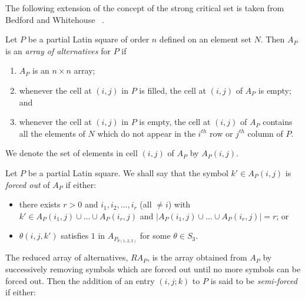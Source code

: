 The following extension of the concept of the strong critical set is
taken from Bedford and Whitehouse ~\cite{bandw}.

Let $P$ be a partial Latin square of order $n$ defined on an element set $N$.  
Then $A_P$ is an {\it array of alternatives} for $P$ if

\begin{enumerate}
\item $A_P$ is an $n \times n$ array;
\item whenever the cell at $(i,j)$ in $P$ is filled, the cell at $(i,j)$ of $A_P$ is empty; and
\item whenever the cell at $(i,j)$ in $P$ is empty, the cell at $(i,j)$ of $A_P$ contains all the elements of $N$ which do not appear in the $i^{th}$ row or $j^{th}$ column of $P$.
\end{enumerate}
We denote the set of elements in cell $(i,j)$ of $A_P$ by ${A_P}(i,j)$.

Let $P$ be a partial Latin square.  
%
We shall say that the symbol
$k'\in A_P(i,j)$ is {\it forced out} of $A_P$ if either:
\begin{itemize}
\item [(1)] there exists $r>0$ and $i_1,i_2,\ldots,i_r$ (all $\neq i$)
with $k'\in A_P(i_1,j)\cup\ldots\cup A_P(i_r,j)$ and
$|A_P(i_1,j)\cup\ldots\cup A_P(i_r,j)|=r$; or
\item [(2)] $\theta(i,j,k')$ satisfies $1$ in $A_{P_{\theta(1,2,3)}}$ for
some $\theta\in S_3$.
\end{itemize}

The reduced array of alternatives,
$RA_P$, is the array obtained from $A_P$ by successively removing
symbols which are forced out until no more symbols can be forced out.
Then the addition
of an entry $(i,j;k)$ to $P$ is said to be {\it semi-forced} if either:

